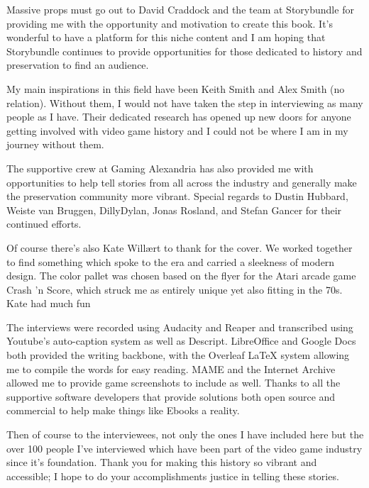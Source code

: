 \quad Massive props must go out to David Craddock and the team at Storybundle for providing me with the opportunity and motivation to create this book. It’s wonderful to have a platform for this niche content and I am hoping that Storybundle continues to provide opportunities for those dedicated to history and preservation to find an audience.

My main inspirations in this field have been Keith Smith and Alex Smith (no relation). Without them, I would not have taken the step in interviewing as many people as I have. Their dedicated research has opened up new doors for anyone getting involved with video game history and I could not be where I am in my journey without them.

The supportive crew at Gaming Alexandria has also provided me with opportunities to help tell stories from all across the industry and generally make the preservation community more vibrant. Special regards to Dustin Hubbard, Weiste van Bruggen, DillyDylan, Jonas Rosland, and Stefan Gancer for their continued efforts.

Of course there’s also Kate Willært to thank for the cover. We worked together to find something which spoke to the era and carried a sleekness of modern design. The color pallet was chosen based on the flyer for the Atari arcade game Crash 'n Score, which struck me as entirely unique yet also fitting in the 70s. Kate had much fun

The interviews were recorded using Audacity and Reaper and transcribed using Youtube’s auto-caption system as well as Descript. LibreOffice and Google Docs both provided the writing backbone, with the Overleaf LaTeX system allowing me to compile the words for easy reading. MAME and the Internet Archive allowed me to provide game screenshots to include as well. Thanks to all the supportive software developers that provide solutions both open source and commercial to help make things like Ebooks a reality.

Then of course to the interviewees, not only the ones I have included here but the over 100 people I’ve interviewed which have been part of the video game industry since it’s foundation. Thank you for making this history so vibrant and accessible; I hope to do your accomplishments justice in telling these stories.
